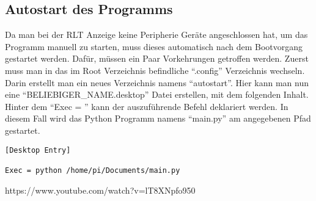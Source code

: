 \subsection{Autostart des Programms} \label{autostart}
Da man bei der RLT Anzeige keine Peripherie Geräte angeschlossen hat, um das Programm manuell zu starten, muss dieses automatisch nach dem Bootvorgang gestartet werden. Dafür, müssen ein Paar Vorkehrungen getroffen werden. \newline Zuerst muss man in das im Root Verzeichnis befindliche \enquote{.config} Verzeichnis wechseln. Darin erstellt man ein neues Verzeichnis namens \enquote{autostart}. Hier kann man nun eine \enquote{BELIEBIGER\_NAME.desktop} Datei erstellen, mit dem folgenden Inhalt. Hinter dem \enquote{Exec = } kann der auszuführende Befehl deklariert werden. In diesem Fall wird das Python Programm namens \enquote{main.py} am angegebenen Pfad gestartet.
\begin{lstlisting}
[Desktop Entry]

Exec = python /home/pi/Documents/main.py
\end{lstlisting}
https://www.youtube.com/watch?v=lT8XNpfo950